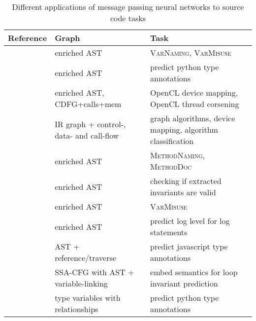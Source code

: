 \documentclass[sigconf,authordraft=true,nonacm=true]{acmart}
\begin{document}
\begin{table*}[t]
  \begin{minipage}{\textwidth}
    \begin{tabularx}{\textwidth}{lXX}
      \toprule
      Reference                              & Graph & Task \\ \midrule
      \citet{allamanis_learning_2018}        & enriched AST & \textsc{VarNaming}, \textsc{VarMisuse} \\
      \citet{allamanis_typilus_2020}         & enriched AST  & predict python type annotations \\
      \citet{brauckmann_compiler-based_2020} & enriched AST, CDFG+calls+mem & OpenCL device mapping, OpenCL thread corsening \\
      \citet{cummins_programl_2020}          & IR graph + control-, data- and call-flow & graph algorithms, device mapping, algorithm classification \\
      \citet{fernandes_structured_2020}      & enriched AST & \textsc{MethodNaming}, \textsc{MethodDoc} \\
      \citet{hellendoorn_are_2019}           & enriched AST & checking if extracted invariants are valid \\
      \citet{hellendoorn_global_2019}        & enriched AST & \textsc{VarMisuse} \\
      \citet{li_using_2019}                  & enriched AST & predict log level for log statements \\
      \citet{schrouff_inferring_2019}        & AST + reference/traverse & predict javascript type annotations \\
      \citet{si_learning_2018}               & SSA-CFG with AST + variable-linking & embed semantics for loop invariant prediction \\
      \citet{wei_lambdanet_2020}             & type variables with relationships & predict python type annotations \\
      \bottomrule
    \end{tabularx}
  \end{minipage}

  \caption{Different applications of message passing neural networks to source code tasks}\label{tbl:mpnn-applications}
\end{table*}
\end{document}
